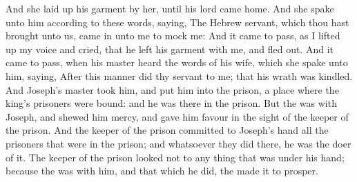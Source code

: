 \begin{biblechapter}
\verse And she laid up his garment by her, until his lord came home.
\verse And she spake unto him according to these words, saying, The Hebrew servant, which thou hast brought unto us, came in unto me to mock me:
\verse And it came to pass, as I lifted up my voice and cried, that he left his garment with me, and fled out.
\verse And it came to pass, when his master heard the words of his wife, which she spake unto him, saying, After this manner did thy servant to me; that his wrath was kindled.
\verse And Joseph's master took him, and put him into the prison, a place where the king's prisoners were bound: and he was there in the prison.
\verse But the \LORD was with Joseph, and shewed him mercy, and gave him favour in the sight of the keeper of the prison.
\verse And the keeper of the prison committed to Joseph's hand all the prisoners that were in the prison; and whatsoever they did there, he was the doer of it.
\verse The keeper of the prison looked not to any thing that was under his hand; because the \LORD was with him, and that which he did, the \LORD made it to prosper.
\end{biblechapter}

